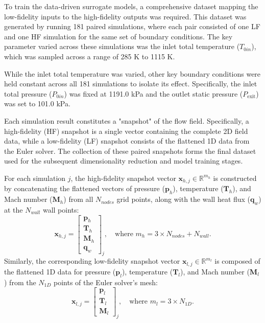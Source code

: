 \documentclass[tg, EN]{ufabcFHZh_tg}
\begin{document}
To train the data-driven surrogate models, a comprehensive dataset mapping the low-fidelity inputs to the high-fidelity outputs was required. This dataset was generated by running 181 paired simulations, where each pair consisted of one LF and one HF simulation for the same set of boundary conditions. The key parameter varied across these simulations was the inlet total temperature ($T_{0in}$), which was sampled across a range of 285 K to 1115 K.

While the inlet total temperature was varied, other key boundary conditions were held constant across all 181 simulations to isolate its effect. Specifically, the inlet total pressure ($P_{0in}$) was fixed at 1191.0 kPa and the outlet static pressure ($P_{\text{exit}}$) was set to 101.0 kPa.

Each simulation result constitutes a "snapshot" of the flow field. Specifically, a high-fidelity (HF) snapshot is a single vector containing the complete 2D field data, while a low-fidelity (LF) snapshot consists of the flattened 1D data from the Euler solver. The collection of these paired snapshots forms the final dataset used for the subsequent dimensionality reduction and model training stages.

For each simulation $j$, the high-fidelity snapshot vector $\mathbf{x}_{h,j} \in \mathbb{R}^{m_h}$ is constructed by concatenating the flattened vectors of pressure ($\mathbf{p}_h$), temperature ($\mathbf{T}_h$), and Mach number ($\mathbf{M}_h$) from all $N_{nodes}$ grid points, along with the wall heat flux ($\mathbf{q}_w$) at the $N_{wall}$ wall points:
\begin{equation}
    \mathbf{x}_{h,j} = 
    \begin{bmatrix}
        \mathbf{p}_h \\
        \mathbf{T}_h \\
        \mathbf{M}_h \\
        \mathbf{q}_w
    \end{bmatrix}_j
    , \quad \text{where } m_h = 3 \times N_{nodes} + N_{wall}.
\end{equation}
Similarly, the corresponding low-fidelity snapshot vector $\mathbf{x}_{l,j} \in \mathbb{R}^{m_l}$ is composed of the flattened 1D data for pressure ($\mathbf{p}_l$), temperature ($\mathbf{T}_l$), and Mach number ($\mathbf{M}_l$) from the $N_{1D}$ points of the Euler solver's mesh:
\begin{equation}
    \mathbf{x}_{l,j} = 
    \begin{bmatrix}
        \mathbf{p}_l \\
        \mathbf{T}_l \\
        \mathbf{M}_l
    \end{bmatrix}_j
    , \quad \text{where } m_l = 3 \times N_{1D}.
\end{equation}
\end{document}
